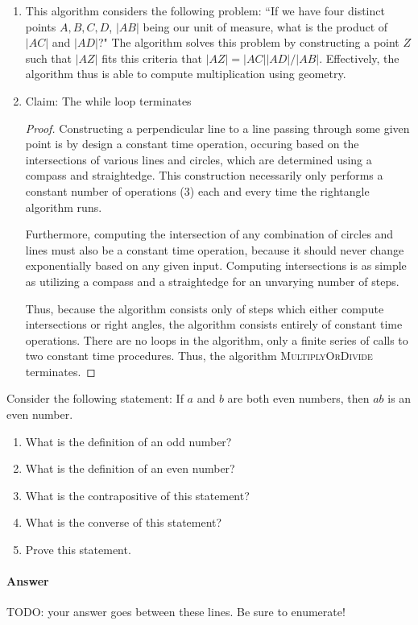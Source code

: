 \documentclass{article}
\begin{document}
\begin{enumerate}
	\item This algorithm considers the following problem: ``If we have four
		distinct points $A,B,C,D$, $|AB|$ being our unit of measure, what is
		the product of $|AC|$ and $|AD|$?" The algorithm solves this problem by
		constructing a point $Z$ such that $|AZ|$ fits this criteria that 
		$|AZ|= |AC||AD|/|AB|$. Effectively, the algorithm thus is able to compute multiplication 
		using geometry.
	\item Claim: The while loop terminates
		\begin{proof}
			Constructing a perpendicular line to a line passing through some given point is by design
			a constant time operation, occuring based on the intersections of various lines and circles,
			which are determined using a compass and straightedge. This construction necessarily only performs
			a constant number of operations (3) each and every time the rightangle algorithm runs.

			Furthermore, computing the intersection of any combination of circles and lines must also be a constant
			time operation, because it should never change exponentially based on any given input. Computing 
			intersections is as simple as utilizing a compass and a straightedge for an unvarying number of steps.

			Thus, because the algorithm consists only of steps which either compute intersections or right angles,
			the algorithm consists entirely of constant time operations. There are no loops in the algorithm, only
			a finite series of calls to two constant time procedures. Thus, the algorithm \textsc{MultiplyOrDivide} terminates.
			
		\end{proof}
\end{enumerate}




\nextprob
Consider the following statement: If $a$ and $b$ are both even numbers, then $ab$ is
an even number.
\begin{enumerate}
    \item What is the definition of an odd number?
    \item What is the definition of an even number?
    \item What is the contrapositive of this statement?
    \item What is the converse of this statement?
    \item Prove this statement.
\end{enumerate}

\paragraph{Answer}


TODO: your answer goes between these lines.  Be sure to enumerate!

\end{document}
